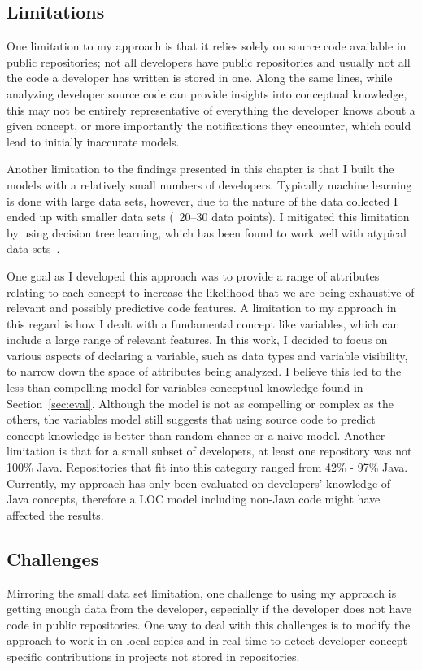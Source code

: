 \subsection{Limitations}
One limitation to my approach is that it relies solely on source code available in public repositories; not all developers have public repositories and usually not all the code a developer has written is stored in one.
Along the same lines, while analyzing developer source code can provide insights into conceptual knowledge, this may not be entirely representative of everything the developer knows about a given concept, or more importantly the notifications they encounter, which could lead to initially inaccurate models.

Another limitation to the findings presented in this chapter is that I built the models with a relatively small numbers of developers. Typically machine learning is done with large data sets, however, due to the nature of the data collected I ended up with smaller data sets (~20--30 data points). I mitigated this limitation by using decision tree learning, which has been found to work well with atypical data sets~\cite{zhang2005missing,kotsiantis2007supervised}.

One goal as I developed this approach was to provide a range of attributes relating to each concept to increase the likelihood that we are being exhaustive of relevant and possibly predictive code features. A limitation to my approach in this regard is how I dealt with a fundamental concept like variables, which can include a large range of relevant features. In this work, I decided to focus on various aspects of declaring a variable, such as data types and variable visibility, to narrow down the space of attributes being analyzed. I believe this led to the less-than-compelling model for variables conceptual knowledge found in Section~\ref{sec:eval}. Although the model is not as compelling or complex as the others, the variables model still suggests that using source code to predict concept knowledge is better than random chance or a naive model.
Another limitation is that for a small subset of developers, at least one repository was not 100\% Java. Repositories that fit into this category ranged from 42\% - 97\% Java.
Currently, my approach has only been evaluated on developers' knowledge of Java concepts, therefore a LOC model including non-Java code might have affected the results. 

\subsection{Challenges}
Mirroring the small data set limitation, one challenge to using my approach is getting enough data from the developer, especially if the developer does not have code in public repositories. One way to deal with this challenges is to modify the approach to work in on local copies and in real-time to detect developer concept-specific contributions in projects not stored in repositories.

